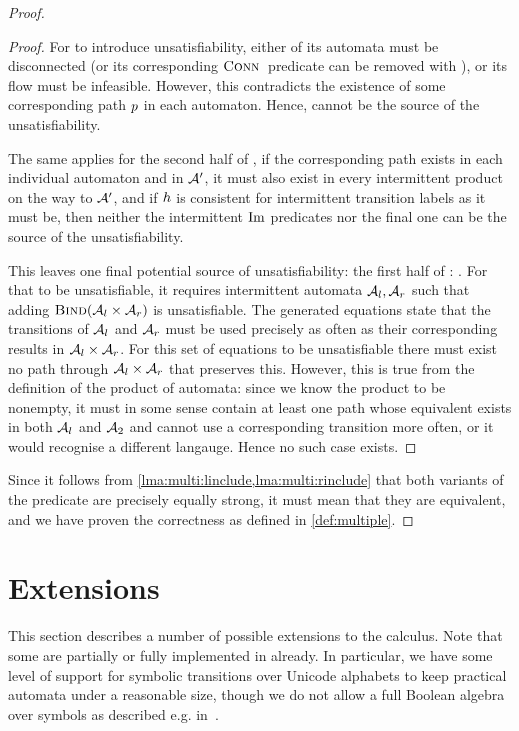 \documentclass[acmsmall,review,anonymous,screen]{acmart}\settopmatter{printfolios=true,printccs=false,printacmref=true}
\theoremstyle{definition}
\begin{document}
\begin{proof}
\begin{proof}
  For \ExpandM{} to introduce unsatisfiability, either of its automata must be
  disconnected (or its corresponding $\operatorname{\textsc{Conn}}{}$ predicate can be removed
  with \Propagate{}), or its flow must be infeasible. However, this contradicts
  the existence of some corresponding path $p$ in each automaton. Hence,
  \ExpandM{} cannot be the source of the unsatisfiability.

  The same applies for the second half of \Materialise{}, if the corresponding
  path exists in each individual automaton and in $\mathcal{A}'$, it must also
  exist in every intermittent product on the way to $\mathcal{A}'$, and if $h$
  is consistent for intermittent transition labels as it must be, then neither the intermittent $\operatorname{Im}$ predicates nor the final one can be the source of the unsatisfiability.

  This leaves one final potential source of unsatisfiability: the first half of
  \Materialise{}: \BindingSum{}. For that to be unsatisfiable, it requires
  intermittent automata $\mathcal{A}_l, \mathcal{A}_r$ such that adding
  $\textsc{Bind}(\mathcal{A}_l \times \mathcal{A}_r)$ is unsatisfiable. The
  generated equations state that the transitions of $\mathcal{A}_l$ and
  $\mathcal{A}_r$ must be used precisely as often as their corresponding results
  in $\mathcal{A}_l \times \mathcal{A}_r$. For this set of equations to be
  unsatisfiable there must exist no path through $\mathcal{A}_l \times
  \mathcal{A}_r$ that preserves this. However, this is true from the definition
  of the product of automata: since we know the product to be nonempty, it must
  in some sense contain at least one path whose equivalent exists in both
  $\mathcal{A}_l$ and $\mathcal{A}_2$ and cannot use a corresponding transition
  more often, or it would recognise a different langauge. Hence no such case
  exists.
\end{proof}

Since it follows from \cref{lma:multi:linclude,lma:multi:rinclude} that both
variants of the predicate are precisely equally strong, it must mean that they
are equivalent, and we have proven the correctness as defined in
\cref{def:multiple}.
\end{proof}


\section{Extensions}\label{sec:extensions}

This section describes a number of possible extensions to the calculus. Note
that some are partially or fully implemented in \Catra{} already. In particular,
we have some level of support for symbolic transitions over Unicode alphabets to
keep practical automata under a reasonable size, though we do not allow a full Boolean algebra over symbols as described e.g. in~\cite{symbolic-automata}.
\end{document}
